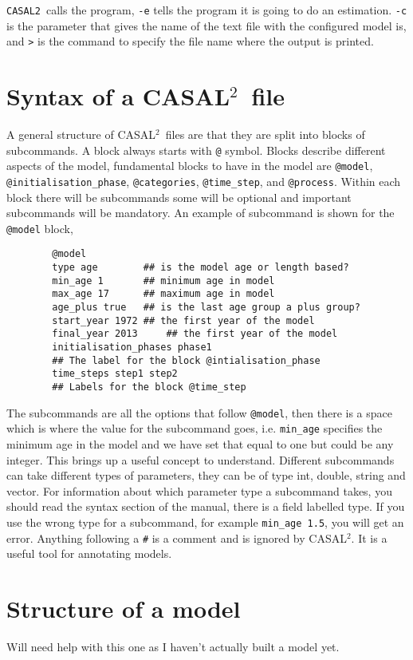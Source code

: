 \documentclass[12pt]{article}
\makeatletter
\newcommand{\cas}{\texttt{CASAL2}}
\newcommand{\CAS}{CASAL$^2$}
\newcommand{\command}[1] {\texttt{@#1}}
\makeatother
\begin{document}
\cas\ calls the program, \texttt{-e} tells the program it is going to do an estimation. \texttt{-c} is the parameter that gives the name of the text file with the configured model is, and \texttt{>} is the command to specify the file name where the output is printed.

\section{Syntax of a \CAS\ file}\label{Sec:stru}
A general structure of \CAS\ files are that they are split into blocks of subcommands. A block always starts with \command{} symbol. Blocks describe different aspects of the model, fundamental blocks to have in the model are \command{model}, \command{initialisation\_phase}, \command{categories}, \command{time\_step}, and \command{process}. Within each block there will be subcommands some will be optional and important subcommands will be mandatory. An example of subcommand is shown for the \command{model} block,

{\small{\begin{verbatim}
		@model
		type age		## is the model age or length based?
		min_age 1		## minimum age in model
		max_age 17		## maximum age in model
		age_plus true	## is the last age group a plus group?
		start_year 1972	## the first year of the model
		final_year 2013 	## the first year of the model
		initialisation_phases phase1	
		## The label for the block @intialisation_phase
		time_steps step1 step2
		## Labels for the block @time_step
		\end{verbatim}}}
The subcommands are all the options that follow \command{model}, then there is a space which is where the value for the subcommand goes, i.e. \texttt{min\_age} specifies the minimum age in the model and we have set that equal to one but could be any integer. This brings up a useful concept to understand. Different subcommands can take different types of parameters, they can be of type int, double, string and vector. For information about which parameter type a subcommand takes, you should read the syntax section of the manual, there is a field labelled type. If you use the wrong type for a subcommand, for example \texttt{min\_age 1.5}, you will get an error. Anything following a \texttt{\#} is a comment and is ignored by \CAS. It is a useful tool for annotating models. 


\section{Structure of a model}\label{Sec:model}
Will need help with this one as I haven't actually built a model yet. 
\end{document}
